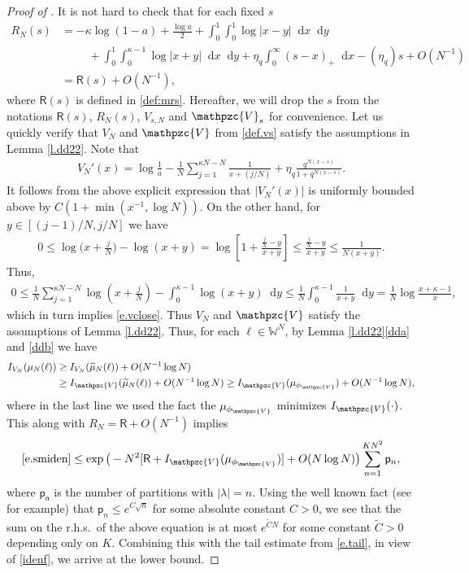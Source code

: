 \documentclass[reqno,11pt]{amsart}
\newcommand{\logq}{\eta_q}
\numberwithin{equation}{section}
\theoremstyle{definition}
\newcommand*\diff{\mathop{}\!\mathrm{d}}
\begin{document}
\begin{proof}[Proof of ]
It is not hard to check that for each fixed $s$
\begin{align*}
    R_N(s) & = -\kappa \log(1-a)+\frac{\log a}{2} +\int_{0}^1 \int_0^1 \log|x-y|\diff x\diff y \\
    &\hspace{1cm}+\int_0^1\int_0^{\kappa -1} \log|x+y|\diff x\diff y+\logq\int_0^\infty (s-x)_+\diff x -(\logq)s +O(N^{-1}) \\ & = \mathsf{R}(s)+O(N^{-1}), 
\end{align*}
where $\mathsf{R}(s)$ is defined in \eqref{def:mrs}. Hereafter, we will drop the $s$ from the notations $\mathsf{R}(s)$, $R_N(s)$, $V_{s,N}$ and $\mathpzc{V}_s$ for convenience. 
Let us quickly verify that $V_N$ and $\mathpzc{V}$ from \eqref{def.vs} satisfy the assumptions in Lemma \ref{l.dd22}. Note that
\begin{align*}
   V_N'(x)=\log\frac1a -\frac{1}{ N}\sum_{j=1}^{\kappa N-N} \frac1{x+(j/N)}+\logq\frac{q^{N(x-s)}}{1+q^{N(x-s)}}.   
\end{align*}
It follows from the above explicit expression that $|V_N'(x)|$ is uniformly bounded above by $C(1+\min(x^{-1},\log N))$. On the other hand, for $y\in [(j-1)/N,j/N]$ we have
\begin{align*}
  0\le  \log \bigg(x+\frac{j}N\bigg) -\log (x+y)= \log \left[1+\frac{\frac{j}N-y}{x+y}\right] \le \frac{\frac{j}N-y}{x+y} \le \frac{1}{N(x+y)}.
\end{align*}
Thus,
\begin{align*}
  0 \le \frac1N\sum_{j=1}^{\kappa N-N}\log (x+\frac{j}{N}) - \int_0^{\kappa -1} \log (x+y)\diff y \le \frac{1}{N} \int_0^{\kappa-1}\frac1{x+y}\diff y = \frac1N\log\frac{x+\kappa-1}{x},
\end{align*}
which in turn implies \eqref{e.vclose}. Thus $V_N$ and $\mathpzc{V}$ satisfy the assumptions of Lemma \ref{l.dd22}. Thus, for each $\ell\in \mathbb{W}^N$, by Lemma \ref{l.dd22}\ref{dda} and \ref{ddb} we have 
 \begin{align*}
  I_{V_N}(\mu_N(\ell)) & \ge I_{V_N}(\widetilde{\mu}_N(\ell))+ O(N^{-1}\log N) \\ & \ge  I_{\mathpzc{V}}(\widetilde{\mu}_N(\ell))+O(N^{-1}\log N) \ge I_{\mathpzc{V}}(\mu_{{\phi}_\mathpzc{V}})+O(N^{-1}\log N),
\end{align*}
where in the last line we used the fact the $\mu_{\phi_{\mathpzc{V}}}$ minimizes $I_{\mathpzc{V}}(\cdot)$. This along with $R_N=\mathsf{R}+O(N^{-1})$ implies
\begin{align*}
 \eqref{e.smiden}  \le \exp\big(-N^2[\mathsf{R}+I_{\mathpzc{V}}(\mu_{{\phi}_\mathpzc{V}})]+O(N\log N)\big)\sum_{n=1}^{KN^2} \mathsf{p}_n,
\end{align*}
where $\mathsf{p_n}$ is the number of partitions with $|\lambda|=n$. Using the well known fact (see \cite[Eq.~(1.15)]{romik_2015} for example) that $\mathsf{p}_n \le e^{C\sqrt{n}}$ for some absolute constant $C>0$, we see that the sum on the r.h.s.~of the above equation is at most $e^{\widetilde{C}N}$ for some constant $\widetilde{C}>0$ depending only on $K$. Combining this with the tail estimate from \eqref{e.tail}, in view of \eqref{idenf}, we arrive at the lower bound. 




\end{proof}
\end{document}
